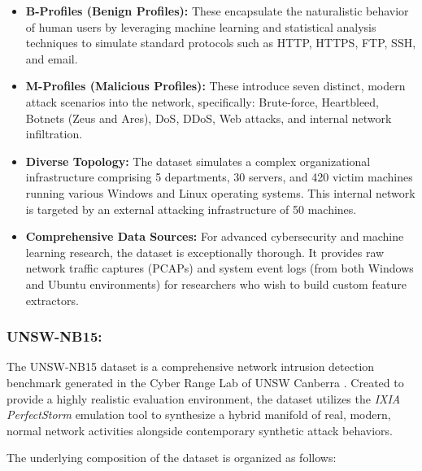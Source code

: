 \documentclass[12pt, a4paper]{report}
\begin{document}
\begin{itemize}
    \item \textbf{B-Profiles (Benign Profiles):} These encapsulate the naturalistic behavior of human users by leveraging machine learning and statistical analysis techniques to simulate standard protocols such as HTTP, HTTPS, FTP, SSH, and email.
    
    \item \textbf{M-Profiles (Malicious Profiles):} These introduce seven distinct, modern attack scenarios into the network, specifically: Brute-force, Heartbleed, Botnets (Zeus and Ares), DoS, DDoS, Web attacks, and internal network infiltration.
    
    \item \textbf{Diverse Topology:} The dataset simulates a complex organizational infrastructure comprising 5 departments, 30 servers, and 420 victim machines running various Windows and Linux operating systems. This internal network is targeted by an external attacking infrastructure of 50 machines.
    
    \item \textbf{Comprehensive Data Sources:} For advanced cybersecurity and machine learning research, the dataset is exceptionally thorough. It provides raw network traffic captures (PCAPs) and system event logs (from both Windows and Ubuntu environments) for researchers who wish to build custom feature extractors.
\end{itemize}


\subsubsection{UNSW-NB15:}


The UNSW-NB15 dataset is a comprehensive network intrusion detection benchmark generated in the Cyber Range Lab of UNSW Canberra \cite{UNSW-NB15dataset}. Created to provide a highly realistic evaluation environment, the dataset utilizes the \textit{IXIA PerfectStorm} emulation tool to synthesize a hybrid manifold of real, modern, normal network activities alongside contemporary synthetic attack behaviors.

The underlying composition of the dataset is organized as follows:
\end{document}
